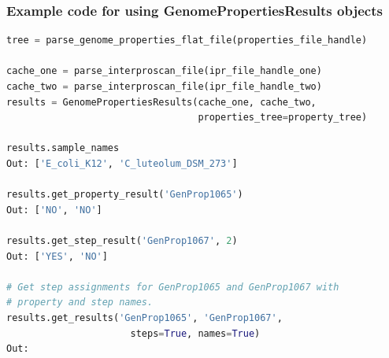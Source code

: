 \subsubsection{Example code for using GenomePropertiesResults objects}

\begin{lstlisting}[language=Python]
tree = parse_genome_properties_flat_file(properties_file_handle)

cache_one = parse_interproscan_file(ipr_file_handle_one)
cache_two = parse_interproscan_file(ipr_file_handle_two)
results = GenomePropertiesResults(cache_one, cache_two, 
                                  properties_tree=property_tree)

results.sample_names
Out: ['E_coli_K12', 'C_luteolum_DSM_273']

results.get_property_result('GenProp1065')
Out: ['NO', 'NO']

results.get_step_result('GenProp1067', 2) 
Out: ['YES', 'NO']

# Get step assignments for GenProp1065 and GenProp1067 with 
# property and step names.
results.get_results('GenProp1065', 'GenProp1067', 
                      steps=True, names=True)
Out:
\end{lstlisting}

\begin{table}[!ht]
\centering
{}
\end{table}

